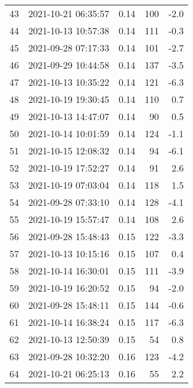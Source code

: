 \begin{tabular}{llrrr}
43  & 2021-10-21 06:35:57 &  0.14 &             100 &                   -2.0 \\
44  & 2021-10-13 10:57:38 &  0.14 &             111 &                   -0.3 \\
45  & 2021-09-28 07:17:33 &  0.14 &             101 &                   -2.7 \\
46  & 2021-09-29 10:44:58 &  0.14 &             137 &                   -3.5 \\
47  & 2021-10-13 10:35:22 &  0.14 &             121 &                   -6.3 \\
48  & 2021-10-19 19:30:45 &  0.14 &             110 &                    0.7 \\
49  & 2021-10-13 14:47:07 &  0.14 &              90 &                    0.5 \\
50  & 2021-10-14 10:01:59 &  0.14 &             124 &                   -1.1 \\
51  & 2021-10-15 12:08:32 &  0.14 &              94 &                   -6.1 \\
52  & 2021-10-19 17:52:27 &  0.14 &              91 &                    2.6 \\
53  & 2021-10-19 07:03:04 &  0.14 &             118 &                    1.5 \\
54  & 2021-09-28 07:33:10 &  0.14 &             128 &                   -4.1 \\
55  & 2021-10-19 15:57:47 &  0.14 &             108 &                    2.6 \\
56  & 2021-09-28 15:48:43 &  0.15 &             122 &                   -3.3 \\
57  & 2021-10-13 10:15:16 &  0.15 &             107 &                    0.4 \\
58  & 2021-10-14 16:30:01 &  0.15 &             111 &                   -3.9 \\
59  & 2021-10-19 16:20:52 &  0.15 &              94 &                   -2.0 \\
60  & 2021-09-28 15:48:11 &  0.15 &             144 &                   -0.6 \\
61  & 2021-10-14 16:38:24 &  0.15 &             117 &                   -6.3 \\
62  & 2021-10-13 12:50:39 &  0.15 &              54 &                    0.8 \\
63  & 2021-09-28 10:32:20 &  0.16 &             123 &                   -4.2 \\
64  & 2021-10-21 06:25:13 &  0.16 &              55 &                    2.2 \\

\end{tabular}

